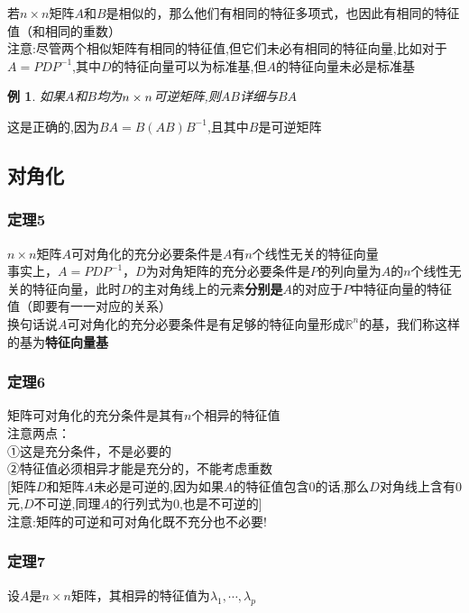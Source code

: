 \documentclass{article}
\newtheorem{example}{例}[subsection]
\newenvironment{cproof}{%
\heiti{证明}\kaishu
}{%
}
\begin{document}
\begin{CJK}{UTF8}{gkai}
若$n\times n$矩阵$A$和$B$是相似的，那么他们有相同的特征多项式，也因此有相同的特征值（和相同的重数）\\

注意:尽管两个相似矩阵有相同的特征值,但它们未必有相同的特征向量,比如对于$A = P D P^{-1}$,其中$D$的特征向量可以为标准基,但$A$的特征向量未必是标准基

\begin{example}
    如果$A$和$B$均为$n\times n$可逆矩阵,则$AB$详细与$BA$
\end{example}
\begin{cproof}
这是正确的,因为$BA = B (AB)B^{-1}$,且其中$B$是可逆矩阵
\end{cproof}
\subsection{对角化}
\subsubsection{定理5}
$n\times n$矩阵$A$可对角化的充分必要条件是$A$有$n$个线性无关的特征向量\\
事实上，$A = P D P^{-1}$，$D$为对角矩阵的充分必要条件是$P$的列向量为$A$的$n$个线性无关的特征向量，此时$D$的主对角线上的元素\textbf{分别是}$A$的对应于$P$中特征向量的特征值（即要有一一对应的关系）\\


换句话说$A$可对角化的充分必要条件是有足够的特征向量形成$\mathbb{R}^n$的基，我们称这样的基为\textbf{特征向量基}\\

\subsubsection{定理6}
矩阵可对角化的充分条件是其有$n$个相异的特征值\\

注意两点：\\
①这是充分条件，不是必要的\\
②特征值必须相异才能是充分的，不能考虑重数\\

[矩阵$D$和矩阵$A$未必是可逆的,因为如果$A$的特征值包含$0$的话,那么$D$对角线上含有$0$元,$D$不可逆,同理$A$的行列式为$0$,也是不可逆的]\\

注意:矩阵的可逆和可对角化既不充分也不必要!

\subsubsection{定理7}
设$A$是$n\times n$矩阵，其相异的特征值为$\lambda_1,\cdots,\lambda_p$\\


\end{CJK}
\end{document}
